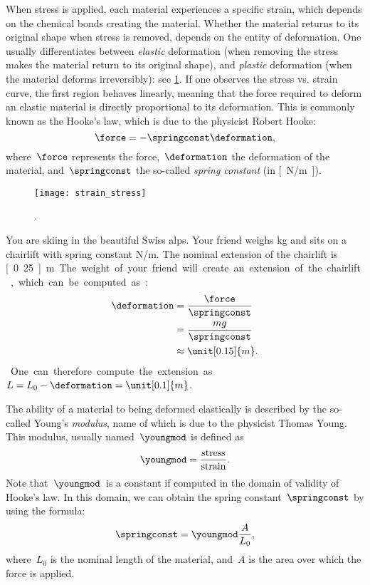 When stress is applied, each material experiences a specific strain, which depends on the chemical bonds creating the material. Whether the material returns to its original shape when stress is removed, depends on the entity of deformation.
One usually differentiates between \emph{elastic} deformation (when removing the stress makes the material return to its original shape), and \emph{plastic} deformation (when the material deforms irreversibly): see \cref{fig:stress_strain}.
If one observes the stress vs. strain curve, the first region behaves linearly, meaning that the force required to deform an elastic material is directly proportional to its deformation.
This is commonly known as the Hooke's law, which is due to the physicist Robert Hooke:
\begin{equation*}
  \force=-\springconst \deformation,
\end{equation*}
where~$\force$ represents the force,~$\deformation$ the deformation of the material, and~$\springconst$ the so-called \emph{spring constant} (in \unit[]{[N/m]}).

\begin{figure}[h]
\begin{center}
\texttt{[image: strain\_stress]}
\end{center}
  \caption{. \label{fig:stress_strain}}
\end{figure}

\begin{example}
  You are skiing in the beautiful Swiss alps. Your friend weighs \unit[100]{kg} and sits on a chairlift with spring constant \unit[4,000]{N/m}. The nominal extension of the chairlift is \unit[0.25]{m}. The weight of your friend will create an extension of the chairlift, which can be computed as:
  \begin{equation*}
  \begin{aligned}
    \deformation &=\frac{\force}{\springconst}\\
    &=\frac{mg}{\springconst}\\
    &\approx \unit[0.15]{m}.
  \end{aligned}
  \end{equation*}
  One can therefore compute the extension as~$L=L_0-\deformation=\unit[0.1]{m}$.
\end{example}

The ability of a material to being deformed elastically is described by the so-called Young's \emph{modulus}, name of which is due to the physicist Thomas Young. This modulus, usually named~$\youngmod$ is defined as
\begin{equation*}
  \youngmod=\frac{\text{stress}}{\text{strain}}.
\end{equation*}
Note that~$\youngmod$~is a constant if computed in the domain of validity of Hooke's law. In this domain, we can obtain the spring constant~$\springconst$ by using the formula:
\begin{equation*}
  \springconst=\youngmod \frac{A}{L_0},
\end{equation*}
where~$L_0$ is the nominal length of the material, and~$A$ is the area over which the force is applied.

